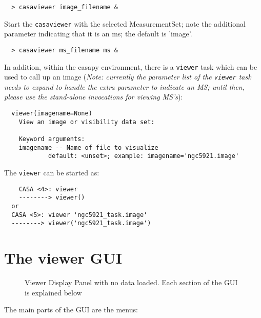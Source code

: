 \small
\begin{verbatim}
  > casaviewer image_filename &
\end{verbatim}
\normalsize

Start the {\tt casaviewer} with the selected MeasurementSet; note the
additional parameter indicating that it is an ms; the default is
'image'.

\small
\begin{verbatim}
  > casaviewer ms_filename ms &
\end{verbatim}
\normalsize

In addition, within the casapy environment, there is a {\tt viewer} task
which can be used to call up an image ({\it Note: currently the
parameter list of the {\tt viewer} task needs to expand to handle the
extra parameter to indicate an MS; until then, please use the
stand-alone invocations for viewing MS's}):

\small
\begin{verbatim}
  viewer(imagename=None)
    View an image or visibility data set:
    
    Keyword arguments:
    imagename -- Name of file to visualize
            default: <unset>; example: imagename='ngc5921.image'
\end{verbatim}
\normalsize


The {\tt viewer} can be started as:

\small
\begin{verbatim}
    CASA <4>: viewer
    --------> viewer()
  or
  CASA <5>: viewer 'ngc5921_task.image'
  --------> viewer('ngc5921_task.image')
\end{verbatim}
\normalsize

\section{The viewer GUI}
\label{section:viewer.GUI}

\begin{figure}[h!]
\caption{\label{fig:viewer0} Viewer Display Panel with no data
  loaded. Each section of the GUI is explained below} 
\hrulefill
\end{figure}
 
The main parts of the GUI are the menus:

